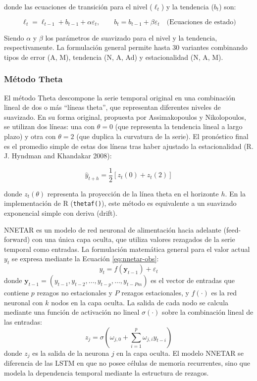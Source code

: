 \documentclass[
  12pt, a4paper, oneside]{article}
\begin{document}
donde las ecuaciones de transición para el nivel (\(\ell_t\)) y la tendencia (\(b_t\)) son:

\begin{equation}
\ell_t = \ell_{t-1} + b_{t-1} + \alpha \varepsilon_t, \qquad b_t = b_{t-1} + \beta \varepsilon_t \quad \text{(Ecuaciones de estado)}
\end{equation}

Siendo \(\alpha\) y \(\beta\) los parámetros de suavizado para el nivel y la tendencia, respectivamente. La formulación general permite hasta 30 variantes combinando tipos de error (A, M), tendencia (N, A, Ad) y estacionalidad (N, A, M).

\subsubsection{Método Theta}\label{muxe9todo-theta}

El método Theta descompone la serie temporal original en una combinación lineal de dos o más ``líneas theta'', que representan diferentes niveles de suavizado. En su forma original, propuesta por Assimakopoulos y Nikolopoulos, se utilizan dos líneas: una con \(\theta=0\) (que representa la tendencia lineal a largo plazo) y otra con \(\theta=2\) (que duplica la curvatura de la serie). El pronóstico final es el promedio simple de estas dos líneas tras haber ajustado la estacionalidad (R. J. Hyndman and Khandakar 2008):

\begin{equation}
\hat{y}_{t+h} = \frac{1}{2} [ z_t(0) + z_t(2) ]
\end{equation}

donde \(z_t(\theta)\) representa la proyección de la línea theta en el horizonte \(h\). En la implementación de R (\texttt{thetaf()}), este método es equivalente a un suavizado exponencial simple con deriva (drift).

NNETAR es un modelo de red neuronal de alimentación hacia adelante (feed-forward) con una única capa oculta, que utiliza valores rezagados de la serie temporal como entradas. La formulación matemática general para el valor actual \(y_t\) se expresa mediante la Ecuación \eqref{eq:nnetar-obs}:
\begin{equation}
y_t = f(\mathbf{y}_{t-1}) + \varepsilon_t
\label{eq:nnetar-obs}
\end{equation}
donde \(\mathbf{y}_{t-1} = (y_{t-1}, y_{t-2}, \dots, y_{t-p}, \dots, y_{t-Pm})\) es el vector de entradas que contiene \(p\) rezagos no estacionales y \(P\) rezagos estacionales, y \(f(\cdot)\) es la red neuronal con \(k\) nodos en la capa oculta. La salida de cada nodo se calcula mediante una función de activación no lineal \(\sigma(\cdot)\) sobre la combinación lineal de las entradas:
\begin{equation}
z_j = \sigma \left( \omega_{j,0} + \sum_{i=1}^{p} \omega_{j,i} y_{t-i} \right)
\end{equation}
donde \(z_j\) es la salida de la neurona \(j\) en la capa oculta. El modelo NNETAR se diferencia de las LSTM en que no posee células de memoria recurrentes, sino que modela la dependencia temporal mediante la estructura de rezagos.
\end{document}
